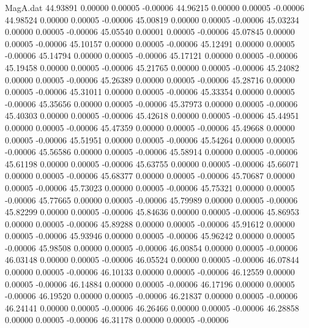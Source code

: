 \begin{filecontents}{MagA.dat}
  44.93891    0.00000    0.00005   -0.00006
  44.96215    0.00000    0.00005   -0.00006
  44.98524    0.00000    0.00005   -0.00006
  45.00819    0.00000    0.00005   -0.00006
  45.03234    0.00000    0.00005   -0.00006
  45.05540    0.00001    0.00005   -0.00006
  45.07845    0.00000    0.00005   -0.00006
  45.10157    0.00000    0.00005   -0.00006
  45.12491    0.00000    0.00005   -0.00006
  45.14794    0.00000    0.00005   -0.00006
  45.17121    0.00000    0.00005   -0.00006
  45.19458    0.00000    0.00005   -0.00006
  45.21765    0.00000    0.00005   -0.00006
  45.24082    0.00000    0.00005   -0.00006
  45.26389    0.00000    0.00005   -0.00006
  45.28716    0.00000    0.00005   -0.00006
  45.31011    0.00000    0.00005   -0.00006
  45.33354    0.00000    0.00005   -0.00006
  45.35656    0.00000    0.00005   -0.00006
  45.37973    0.00000    0.00005   -0.00006
  45.40303    0.00000    0.00005   -0.00006
  45.42618    0.00000    0.00005   -0.00006
  45.44951    0.00000    0.00005   -0.00006
  45.47359    0.00000    0.00005   -0.00006
  45.49668    0.00000    0.00005   -0.00006
  45.51951    0.00000    0.00005   -0.00006
  45.54264    0.00000    0.00005   -0.00006
  45.56586    0.00000    0.00005   -0.00006
  45.58914    0.00000    0.00005   -0.00006
  45.61198    0.00000    0.00005   -0.00006
  45.63755    0.00000    0.00005   -0.00006
  45.66071    0.00000    0.00005   -0.00006
  45.68377    0.00000    0.00005   -0.00006
  45.70687    0.00000    0.00005   -0.00006
  45.73023    0.00000    0.00005   -0.00006
  45.75321    0.00000    0.00005   -0.00006
  45.77665    0.00000    0.00005   -0.00006
  45.79989    0.00000    0.00005   -0.00006
  45.82299    0.00000    0.00005   -0.00006
  45.84636    0.00000    0.00005   -0.00006
  45.86953    0.00000    0.00005   -0.00006
  45.89288    0.00000    0.00005   -0.00006
  45.91612    0.00000    0.00005   -0.00006
  45.93946    0.00000    0.00005   -0.00006
  45.96242    0.00000    0.00005   -0.00006
  45.98508    0.00000    0.00005   -0.00006
  46.00854    0.00000    0.00005   -0.00006
  46.03148    0.00000    0.00005   -0.00006
  46.05524    0.00000    0.00005   -0.00006
  46.07844    0.00000    0.00005   -0.00006
  46.10133    0.00000    0.00005   -0.00006
  46.12559    0.00000    0.00005   -0.00006
  46.14884    0.00000    0.00005   -0.00006
  46.17196    0.00000    0.00005   -0.00006
  46.19520    0.00000    0.00005   -0.00006
  46.21837    0.00000    0.00005   -0.00006
  46.24141    0.00000    0.00005   -0.00006
  46.26466    0.00000    0.00005   -0.00006
  46.28858    0.00000    0.00005   -0.00006
  46.31178    0.00000    0.00005   -0.00006

\end{filecontents}
